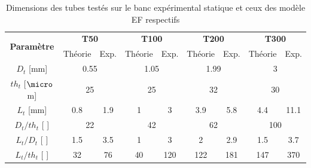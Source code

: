\begin{table}[!htbp]
	\centering
		\begin{tabular}[t]{|c||c|c|c|c|c|c|c|c|}
\hline
\multirow{2}{*}{\textbf{Paramètre}} &
\multicolumn{2}{|c|}{\textbf{T50}} & 
\multicolumn{2}{|c|}{\textbf{T100}} & 
\multicolumn{2}{|c|}{\textbf{T200}} & 
\multicolumn{2}{|c|}{\textbf{T300}} \\
\cline{2-9} 
& \multicolumn{1}{|c|}{Théorie} & \multicolumn{1}{|c|}{Exp.} & 
  \multicolumn{1}{|c|}{Théorie} & \multicolumn{1}{|c|}{Exp.} &
  \multicolumn{1}{|c|}{Théorie} & \multicolumn{1}{|c|}{Exp.} &
  \multicolumn{1}{|c|}{Théorie} & \multicolumn{1}{|c|}{Exp.} \\
\hline \hline
$D_t$ [mm] & \multicolumn{2}{|c|}{0.55} & \multicolumn{2}{|c|}{1.05} & \multicolumn{2}{|c|}{1.99} & \multicolumn{2}{|c|}{3} \\
\hline
$th_t$ [$\micro$m] & \multicolumn{2}{|c|}{25} & \multicolumn{2}{|c|}{25} & \multicolumn{2}{|c|}{32} & \multicolumn{2}{|c|}{30} \\
\hline
$L_t$ [mm]  &  0.8  &  1.9  &  1  &  3  & 3.9  &  5.8  &  4.4  &  11.1 \\
\hline
$D_t/th_t$ [ ] &\multicolumn{2}{|c|}{22} & \multicolumn{2}{|c|}{42} & \multicolumn{2}{|c|}{62} & \multicolumn{2}{|c|}{100} \\
\hline
$L_t/D_t$ [ ]  &  1.5  &  3.5  &  1  &  3  &  2   &  2.9  &  1.5  &  3.7 \\
\hline
$L_t/th_t$ [ ] &   32  &   76  &  40 & 120 &  122 &  181  &  147  &  370 \\
\hline
		\end{tabular}
        \caption{Dimensions des tubes testés sur le banc expérimental statique et ceux des modèle EF respectifs}
        \label{tab:dim_tube_statique_simu/exp}
\end{table}     
